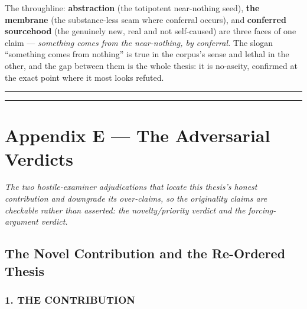 \documentclass[11pt]{article}
\begin{document}
The throughline: \textbf{abstraction} (the totipotent near-nothing seed), \textbf{the membrane} (the substance-less seam where conferral occurs), and \textbf{conferred sourcehood} (the genuinely new, real and not self-caused) are three faces of one claim — \emph{something comes from the near-nothing, by conferral.} The slogan ``something comes from nothing'' is true in the corpus's sense and lethal in the other, and the gap between them is the whole thesis: it is no-aseity, confirmed at the exact point where it most looks refuted.

\medskip\noindent\rule{\linewidth}{0.3pt}\medskip

\medskip\noindent\rule{\linewidth}{0.3pt}\medskip

\section*{Appendix E — The Adversarial Verdicts}

\emph{The two hostile-examiner adjudications that locate this thesis's honest contribution and downgrade its over-claims, so the originality claims are checkable rather than asserted: the novelty/\allowbreak{}priority verdict and the forcing-argument verdict.}

\subsection*{The Novel Contribution and the Re-Ordered Thesis}

\subsubsection*{1. THE CONTRIBUTION}
\end{document}
